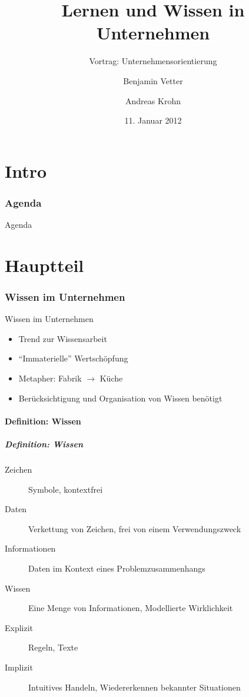 \documentclass[ngerman,compress,hyperref={bookmarks}]{beamer}
\title{Lernen und Wissen in Unternehmen}
\subtitle{Vortrag: Unternehmensorientierung}
\author{Benjamin Vetter \and Andreas Krohn}
\institute[HAW]{Hochschule für Angewandte Wissenschaften Hamburg}
\date[WS 2011/12]{11. Januar 2012}
\begin{document}
\frame[plain]{\titlepage}

\part{Intro}
\section*{Agenda}
\begin{frame}{Agenda} \setcounter{tocdepth}{1} \tableofcontents[part=1] \setcounter{tocdepth}{3} \end{frame}

\part{Hauptteil}
\section{Wissen im Unternehmen}
\begin{frame}{Wissen im Unternehmen}
\begin{itemize}
 \item Trend zur Wissensarbeit
 \item ``Immaterielle'' Wertschöpfung
 \item Metapher: Fabrik $\rightarrow$ Küche
 \item Berücksichtigung und Organisation von Wissen benötigt
\end{itemize}
\end{frame}

\subsection{Definition: Wissen}
\begin{frame}[allowframebreaks]
\frametitle{Definition: Wissen}
\begin{description}
 \item[Zeichen] Symbole, kontextfrei
 \item[Daten] Verkettung von Zeichen, frei von einem Verwendungszweck
 \item[Informationen] Daten im Kontext eines Problemzusammenhangs
 \item[Wissen] Eine Menge von Informationen, Modellierte Wirklichkeit
\end{description}
\framebreak
\begin{description}
 \item[Explizit] Regeln, Texte
 \item[Implizit] Intuitives Handeln, Wiedererkennen bekannter Situationen
\end{description}
\end{frame}
\end{document}
